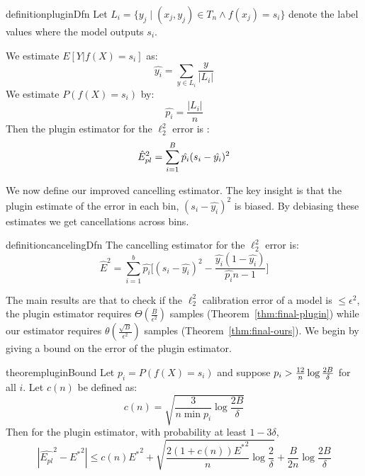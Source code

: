 \begin{restatable}{definition}{pluginDfn}
\label{dfn:plugin-estimator}
  Let $L_i = \{ y_j \; | \; (x_j, y_j) \in T_n\wedge f(x_j) = s_i \}$  denote the label values where the model outputs $s_i$.

We estimate $E[Y | f(X) = s_i]$ as:
\[ \hat{y_i} = \sum_{y \in L_i} \frac{y}{|L_i|} \] 
We estimate $P(f(X) = s_i)$ by:
\[ \hat{p_i} = \frac{|L_i|}{n} \]
  Then the plugin estimator for the $\ell_2^2$ error is :
\[ \hat{E}_{pl}^2{} = \sum_{i=1}^B \hat{p_i} (s_i - \hat{y_i})^2 \]
\end{restatable}

We now define our improved cancelling estimator. The key insight is that the plugin estimate of the error in each bin, $(s_i - \hat{y_i})^2$ is biased. By debiasing these estimates we get cancellations across bins.

\begin{restatable}{definition}{cancelingDfn}
The cancelling estimator for the $\ell_2^2$ error is:
\[ \hat{E}^2 = \sum_{i=1}^b \hat{p_i} \Big[ (s_i - \hat{y_i})^2 - \frac{\hat{y_i}(1 - \hat{y_i})}{\hat{p_i}n-1} \Big] \]
\end{restatable}

The main results are that to check if the $\ell_2^2$ calibration error of a model is $\leq \epsilon^2$, the plugin estimator requires $\Theta(\frac{B}{\epsilon^2})$ samples (Theorem~\ref{thm:final-plugin}) while our estimator requires $\theta(\frac{\sqrt{B}}{\epsilon^2})$ samples (Theorem~\ref{thm:final-ours}). We begin by giving a bound on the error of the plugin estimator.

\begin{restatable}{theorem}{pluginBound}
\label{thm:plugin-bound}
Let $p_i = P(f(X) = s_i)$ and suppose $p_i > \frac{12}{n}\log{\frac{2B}{\delta}}{}$ for all $i$. Let $c(n)$ be defined as:
\[ c(n) = \sqrt{\frac{3}{n \min p_i} \log{\frac{2B}{\delta}}} \]
Then for the plugin estimator, with probability at least $1 - 3\delta$,
\[ | \hat{E_{pl}}^2 - {E^*}^2 | \leq c(n){E^*}^2 + \sqrt{\frac{2(1+c(n)){E^*}^2}{n} \log{\frac{2}{\delta}}} + \frac{B}{2n} \log{\frac{2B}{\delta}} \]
\end{restatable}

